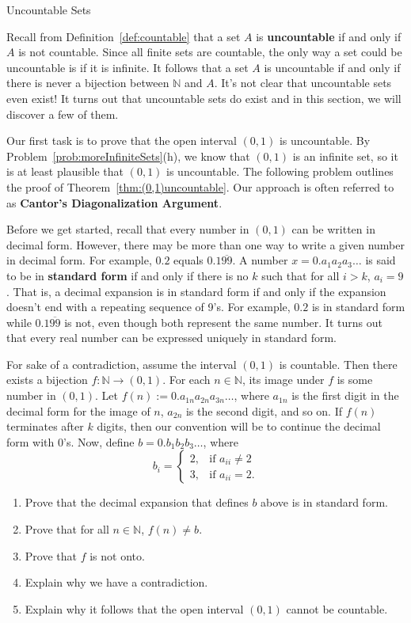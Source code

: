\begin{section}{Uncountable Sets}

Recall from Definition~\ref{def:countable} that a set $A$ is \textbf{uncountable} if and only if $A$ is not countable.  Since all finite sets are countable, the only way a set could be uncountable is if it is infinite.  It follows that a set $A$ is uncountable if and only if there is never a bijection between $\mathbb{N}$ and $A$.  It's not clear that uncountable sets even exist!  It turns out that uncountable sets do exist and in this section, we will discover a few of them.

Our first task is to prove that the open interval $(0,1)$ is uncountable.  By Problem~\ref{prob:moreInfiniteSets}(h), we know that $(0,1)$ is an infinite set, so it is at least plausible that $(0,1)$ is uncountable.  The following problem outlines the proof of Theorem~\ref{thm:(0,1)uncountable}.  Our approach is often referred to as \textbf{Cantor's Diagonalization Argument}.

Before we get started, recall that every number in $(0,1)$ can be written in decimal form. However, there may be more than one way to write a given number in decimal form.  For example, $0.2$ equals $0.1\overline{99}$.  A number $x=0.a_1a_2a_3\ldots$ is said to be in \textbf{standard form} if and only if there is no $k$ such that for all $i>k$, $a_i=9$. That is, a decimal expansion is in standard form if and only if the expansion doesn't end with a repeating sequence of 9's. For example, $0.2$ is in standard form while $0.1\overline{99}$ is not, even though both represent the same number. It turns out that every real number can be expressed uniquely in standard form.

\begin{problem}
For sake of a contradiction, assume the interval $(0,1)$ is countable.  Then there exists a bijection $f:\mathbb{N}\to (0,1)$. For each $n\in\mathbb{N}$, its image under $f$ is some number in $(0,1)$.  Let $f(n):=0.a_{1n}a_{2n}a_{3n}\ldots$, where $a_{1n}$ is the first digit in the decimal form for the image of $n$, $a_{2n}$ is the second digit, and so on. If $f(n)$ terminates after $k$ digits, then our convention will be to continue the decimal form with 0's. Now, define $b=0.b_1b_2b_3\ldots$, where
\[
b_i=\begin{cases}
2, & \text{if }a_{ii}\neq 2\\
3, & \text{if }a_{ii}=2.
\end{cases}
\]
\begin{enumerate}[label=\textrm{(\alph*)}]
\item Prove that the decimal expansion that defines $b$ above is in standard form.
\item Prove that for all $n\in\mathbb{N}$, $f(n)\neq b$.
\item Prove that $f$ is not onto.
\item Explain why we have a contradiction.
\item Explain why it follows that the open interval $(0,1)$ cannot be countable.
\end{enumerate}
\end{problem}


\end{section}
